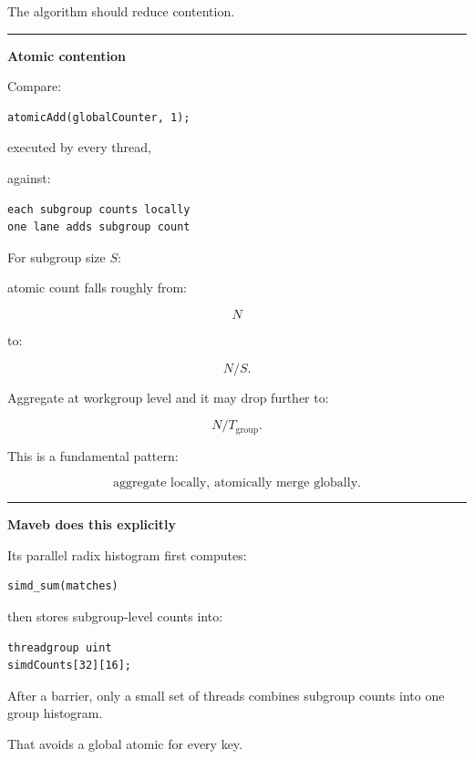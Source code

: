 The algorithm should reduce contention.

\begin{center}\rule{0.5\linewidth}{0.5pt}\end{center}

\textbf{Atomic contention}

Compare:

\protect{}\label{3nct9g}%
\begin{verbatim}
atomicAdd(globalCounter, 1);
\end{verbatim}

executed by every thread,

against:

\protect{}\label{oah6qe}%
\begin{verbatim}
each subgroup counts locally
one lane adds subgroup count
\end{verbatim}

For subgroup size \(S\):

atomic count falls roughly from:

\[
N
\]

to:

\[
N/S.
\]

Aggregate at workgroup level and it may drop further to:

\[
N/T_{\text{group}}.
\]

This is a fundamental pattern:

\[
\boxed{
\text{aggregate locally, atomically merge globally}.
}
\]

\begin{center}\rule{0.5\linewidth}{0.5pt}\end{center}

\textbf{Maveb does this explicitly}

Its parallel radix histogram first computes:

\protect{}\label{l7udrw}%
\begin{verbatim}
simd_sum(matches)
\end{verbatim}

then stores subgroup-level counts into:

\protect{}\label{af4u60}%
\begin{verbatim}
threadgroup uint
simdCounts[32][16];
\end{verbatim}

After a barrier, only a small set of threads combines subgroup counts into one group histogram.

That avoids a global atomic for every key.

